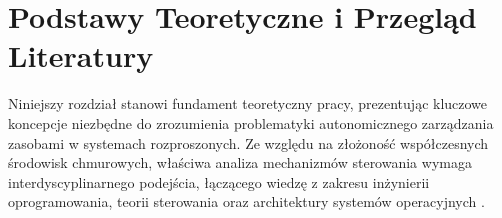 % 
% 
% 
% 
% 
% 
% 
% 
% 
% 







\newpage

\section{Podstawy Teoretyczne i Przegląd Literatury}

Niniejszy rozdział stanowi fundament teoretyczny pracy, prezentując kluczowe koncepcje niezbędne 
do zrozumienia problematyki autonomicznego zarządzania zasobami w systemach rozproszonych. Ze 
względu na złożoność współczesnych środowisk chmurowych, właściwa analiza mechanizmów 
sterowania wymaga interdyscyplinarnego podejścia, łączącego wiedzę z zakresu inżynierii 
oprogramowania, teorii sterowania oraz architektury systemów operacyjnych \cite{burns2016kubernetes}.

